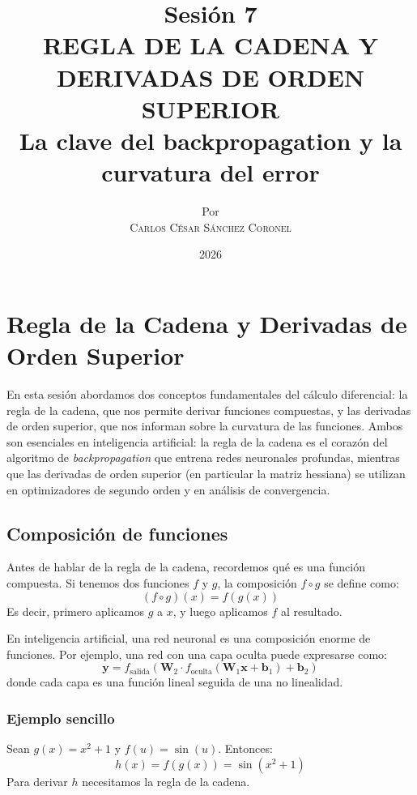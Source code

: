 \documentclass[12pt,a4paper,openany,oneside]{book}
\title{
    \textbf{Sesión 7} \\ 
    \Huge \textbf{REGLA DE LA CADENA Y DERIVADAS DE ORDEN SUPERIOR} \\
    \large La clave del backpropagation y la curvatura del error \\

}
\author{
    \small Por \\ \vspace{0.2cm}
    \Large \textsc{Carlos César Sánchez Coronel}
}
\date{2026}
\begin{document}
\maketitle
\tableofcontents
{}

\chapter{Regla de la Cadena y Derivadas de Orden Superior}

En esta sesión abordamos dos conceptos fundamentales del cálculo diferencial: la regla de la cadena, que nos permite derivar funciones compuestas, y las derivadas de orden superior, que nos informan sobre la curvatura de las funciones. Ambos son esenciales en inteligencia artificial: la regla de la cadena es el corazón del algoritmo de \textit{backpropagation} que entrena redes neuronales profundas, mientras que las derivadas de orden superior (en particular la matriz hessiana) se utilizan en optimizadores de segundo orden y en análisis de convergencia.

\section{Composición de funciones}

Antes de hablar de la regla de la cadena, recordemos qué es una función compuesta. Si tenemos dos funciones $f$ y $g$, la composición $f \circ g$ se define como:
\[
(f \circ g)(x) = f(g(x))
\]
Es decir, primero aplicamos $g$ a $x$, y luego aplicamos $f$ al resultado.

En inteligencia artificial, una red neuronal es una composición enorme de funciones. Por ejemplo, una red con una capa oculta puede expresarse como:
\[
\mathbf{y} = f_{\text{salida}}( \mathbf{W}_2 \cdot f_{\text{oculta}}( \mathbf{W}_1 \mathbf{x} + \mathbf{b}_1 ) + \mathbf{b}_2 )
\]
donde cada capa es una función lineal seguida de una no linealidad.

\subsection{Ejemplo sencillo}
Sean $g(x) = x^2 + 1$ y $f(u) = \sin(u)$. Entonces:
\[
h(x) = f(g(x)) = \sin(x^2 + 1)
\]
Para derivar $h$ necesitamos la regla de la cadena.
\end{document}
